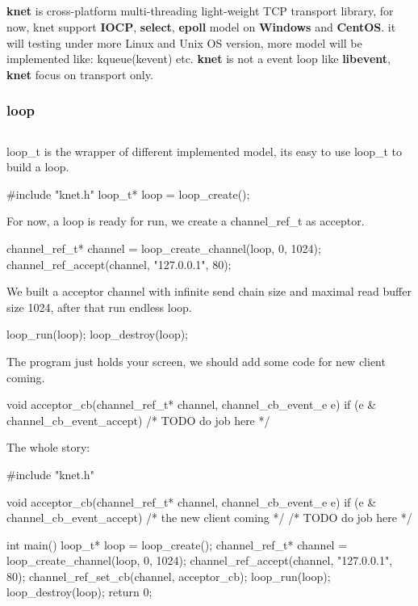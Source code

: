 \subsection*{}

{\bfseries knet} is cross-\/platform multi-\/threading light-\/weight T\+C\+P transport library, for now, knet support {\bfseries I\+O\+C\+P}, {\bfseries select}, {\bfseries epoll} model on {\bfseries Windows} and {\bfseries Cent\+O\+S}. it will testing under more Linux and Unix O\+S version, more model will be implemented like\+: kqueue(kevent) etc. {\bfseries knet} is not a event loop like {\bfseries libevent}, {\bfseries knet} focus on transport only.

\subsubsection*{loop}

\subsection*{}

{\ttfamily loop\+\_\+t} is the wrapper of different implemented model, it\textquotesingle{}s easy to use {\ttfamily loop\+\_\+t} to build a loop. \begin{DoxyVerb}#include "knet.h"
loop_t* loop = loop_create();
\end{DoxyVerb}


For now, a loop is ready for run, we create a {\ttfamily channel\+\_\+ref\+\_\+t} as acceptor. \begin{DoxyVerb}channel_ref_t* channel = loop_create_channel(loop, 0, 1024);
channel_ref_accept(channel, "127.0.0.1", 80);
\end{DoxyVerb}


We built a acceptor channel with infinite send chain size and maximal read buffer size 1024, after that run endless loop. \begin{DoxyVerb}loop_run(loop);
loop_destroy(loop);
\end{DoxyVerb}


The program just holds your screen, we should add some code for new client coming. \begin{DoxyVerb}void acceptor_cb(channel_ref_t* channel, channel_cb_event_e e) {
    if (e & channel_cb_event_accept) {
        /* TODO do job here */
    }
}
\end{DoxyVerb}


The whole story\+: \begin{DoxyVerb}#include "knet.h"

void acceptor_cb(channel_ref_t* channel, channel_cb_event_e e) {
    if (e & channel_cb_event_accept) { /* the new client coming */
        /* TODO do job here */
    }
}

int main() {
    loop_t* loop = loop_create();
    channel_ref_t* channel = loop_create_channel(loop, 0, 1024);
    channel_ref_accept(channel, "127.0.0.1", 80);
    channel_ref_set_cb(channel, acceptor_cb);
    loop_run(loop);
    loop_destroy(loop);
    return 0;
}
\end{DoxyVerb}


